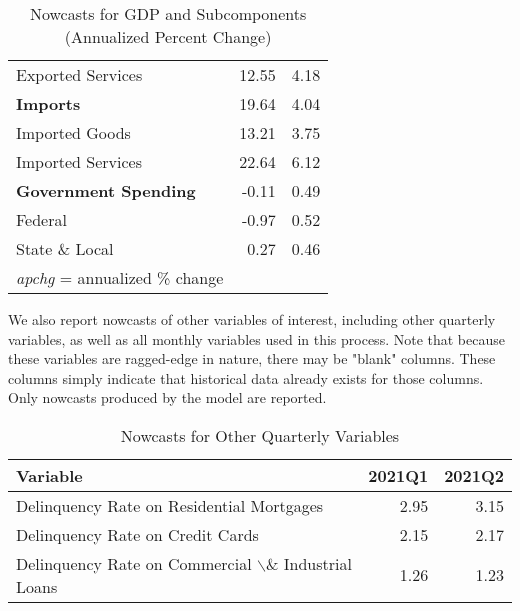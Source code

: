 \documentclass[11pt, letterpaper]{article}\usepackage[]{graphicx}\usepackage[]{color}
\begin{document}
\begin{table}[H]
\begin{tabular}{lrr}
  \hspace{8mm}  Exported Services & 12.55 & 4.18 \\ 
  \hspace{0mm} \textbf{Imports} & 19.64 & 4.04 \\ 
  \hspace{8mm}  Imported Goods & 13.21 & 3.75 \\ 
  \hspace{8mm}  Imported Services & 22.64 & 6.12 \\ 
  \hspace{0mm} \textbf{Government Spending} & -0.11 & 0.49 \\ 
  \hspace{8mm}  Federal & -0.97 & 0.52 \\ 
  \hspace{8mm}  State \& Local & 0.27 & 0.46 \\ 
   \hline 
 \textit{apchg} = annualized \% change 
\end{tabular}
\endgroup
\caption{Nowcasts for GDP and Subcomponents (Annualized Percent Change)} 
\end{table}


We also report nowcasts of other variables of interest, including other quarterly variables, as well as all monthly variables used in this process. Note that because these variables are ragged-edge in nature, there may be "blank" columns. These columns simply indicate that historical data already exists for those columns. Only nowcasts produced by the model are reported.
\begin{table}[H]
\centering
\begingroup\fontsize{11pt}{13pt}\selectfont
\begin{tabular}{lrr}
  \hline
Variable & 2021Q1 & 2021Q2 \\ 
  \hline
Delinquency Rate on Residential Mortgages & 2.95 & 3.15 \\ 
  Delinquency Rate on Credit Cards & 2.15 & 2.17 \\ 
  Delinquency Rate on Commercial $\backslash$\& Industrial Loans & 1.26 & 1.23 \\ 
   \hline
\end{tabular}
\endgroup
\caption{Nowcasts for Other Quarterly Variables} 
\end{table}
\end{document}
